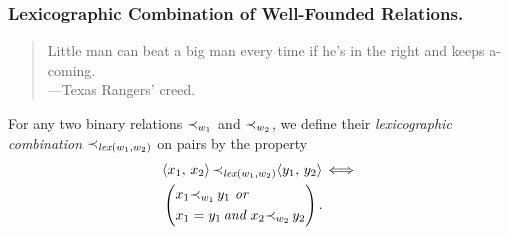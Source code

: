\documentclass[runningheads]{llncs}
\DeclareMathOperator{\uand}{\emph{and}\,}
\DeclareMathOperator{\uor}{\emph{or}\,}
\DeclareMathOperator{\uiff}{\iff}
\DeclareMathOperator{\lex}{\emph{lex}}
\DeclareMathOperator{\mgi}{\emph{mgi}}
\begin{document}
 


\subsubsection{Lexicographic Combination of Well-Founded Relations.}
\begin{quote}
Little man can beat a big man every time if he's in the right and keeps a-coming.
\\---Texas Rangers' creed.
\end{quote}

 For any two binary relations ${\prec}_{{w}_{1}}$ and  ${\prec}_{{w}_{2}}$, we define their \emph{lexicographic combination} $\expsub{\prec}{\lex(\expsub{w}{1}, \expsub{w}{2})}$ on pairs by the property
 \begin{alignat*}{2}
  \begin{split}
  &\langle \varsub{x}{1}, \,  \varsub{x}{2}\rangle \, \expsub{\prec}{\lex(\expsub{w}{1}, \expsub{w}{2})} \langle \varsub{y}{1}, \,  \varsub{y}{2}\rangle
  \uiff \\
  &\left(\begin{aligned}
  &\varsub{x}{1} \expsub{\prec}{\expsub{w}{1}} \, \varsub{y}{1} \, \uor \, \\
  &\varsub{x}{1} = \varsub{y}{1} \uand
  \varsub{x}{2} \expsub{\prec}{\expsub{w}{2}} \, \varsub{y}{2}  
  \end{aligned}\right).
  \end{split}
\end{alignat*} 


 
  
 
\end{document}
